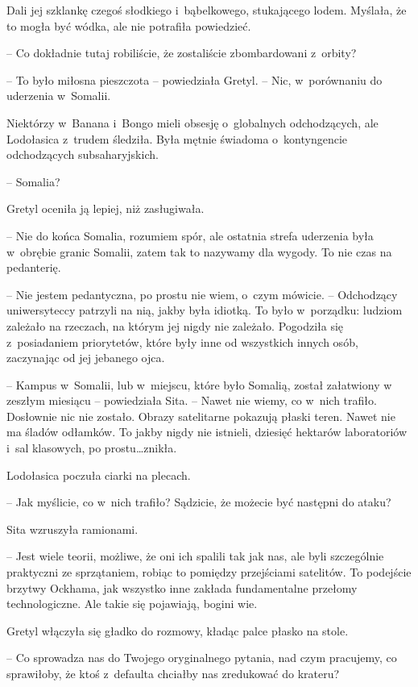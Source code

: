 \documentclass[oneside,polish,11pt,sfheadings]{mwbk}
\begin{document}
Dali jej szklankę czegoś słodkiego i~bąbelkowego, stukającego lodem.
Myślała, że to mogła być wódka, ale nie potrafiła powiedzieć. 

-- Co
dokładnie tutaj robiliście, że zostaliście zbombardowani z~orbity?

-- To było miłosna pieszczota -- powiedziała Gretyl. -- Nic, w~porównaniu
do uderzenia w~Somalii.

Niektórzy w~Banana i~Bongo mieli obsesję o~globalnych odchodzących, ale
Lodołasica z~trudem śledziła. Była mętnie świadoma o~kontyngencie
odchodzących subsaharyjskich.

-- Somalia?

Gretyl oceniła ją lepiej, niż zasługiwała. 

-- Nie do końca Somalia,
rozumiem spór, ale ostatnia strefa uderzenia była w~obrębie granic
Somalii, zatem tak to nazywamy dla wygody. To nie czas na pedanterię.

-- Nie jestem pedantyczna, po prostu nie wiem, o~czym mówicie. -- Odchodzący uniwersyteccy patrzyli na nią, jakby była idiotką. To było w~porządku: ludziom zależało na rzeczach, na którym jej nigdy nie
zależało. Pogodziła się z~posiadaniem priorytetów, które były inne od
wszystkich innych osób, zaczynając od jej jebanego ojca.

-- Kampus w~Somalii, lub w~miejscu, które było Somalią, został załatwiony
w zeszłym miesiącu -- powiedziała Sita. -- Nawet nie wiemy, co w~nich
trafiło. Dosłownie nic nie zostało. Obrazy satelitarne pokazują płaski
teren. Nawet nie ma śladów odłamków. To jakby nigdy nie istnieli,
dziesięć hektarów laboratoriów i~sal klasowych, po prostu\ldots  znikła.

Lodołasica poczuła ciarki na plecach. 

-- Jak myślicie, co w~nich trafiło?
Sądzicie, że możecie być następni do ataku?

Sita wzruszyła ramionami. 

-- Jest wiele teorii, możliwe, że oni ich
spalili tak jak nas, ale byli szczególnie praktyczni ze sprzątaniem,
robiąc to pomiędzy przejściami satelitów. To podejście brzytwy Ockhama,
jak wszystko inne zakłada fundamentalne przełomy technologiczne. Ale
takie się pojawiają, bogini wie.

Gretyl włączyła się gładko do rozmowy, kładąc palce płasko na stole. 

-- Co sprowadza nas do Twojego oryginalnego pytania, nad czym pracujemy, co
sprawiłoby, że ktoś z~defaulta chciałby nas zredukować do krateru?
\end{document}
